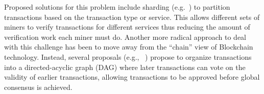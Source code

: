 Proposed solutions for this problem include sharding (e.g.~\cite{CCS:LNZBGS16, FC:GenRenSir17}) to partition transactions based on the transaction type or service.
This allows different sets of miners to verify transactions for different services thus reducing the amount of verification work each miner must do.  Another more radical approach to deal with this challenge has been to move away from the ``chain'' view of Blockchain technology.  Instead, several proposals (e.g., ~\cite{ePrint:SomLewZoh16,eprint:SomZoh18,IOTA}) propose to organize transactions into a directed-acyclic graph (DAG) where later transactions can vote on the validity of earlier transactions, allowing transactions to be approved before global consensus is achieved.
%
%


